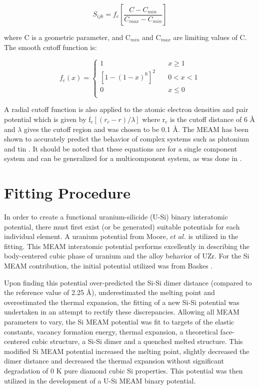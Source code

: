 \documentclass[review]{elsarticle}
\begin{document}
\begin{equation}
\label{eq:eqn15}
S_{ijk}= f_{c}\left[\frac{C-C_{min}}{C_{max}-C_{min}}\right]
\end{equation}

where C is a geometric parameter, and C$_{min}$ and C$_{max}$ are limiting values of C.  The smooth cutoff function is:

\begin{equation}
\label{eq:eqn16}
f_{c}(x) = \begin{cases}
    1       & \quad x \geq 1 \\
    [1-(1-x)^{6}]^{2}  & \quad 0 < x < 1\\
    0       & \quad x \leq 0\\
  \end{cases} 
\end{equation}

A radial cutoff function is also applied to the atomic electron densities and pair potential which is given by f$_{c}[(r_{c}-r)/\lambda]$ where r$_{c}$ is the cutoff distance of 6 {\AA } and $\lambda$ gives the cutoff region and was chosen to be 0.1 {\AA}.  The MEAM has been shown to accurately predict the behavior of complex systems such as plutonium \cite{baskes2000} and tin \cite{baskes1997}.  It should be noted that these equations are for a single component system and can be generalized for a multicomponent system, as was done in \cite{baskes2014}.  

\section{Fitting Procedure}
In order to create a functional uranium-silicide (U-Si) binary interatomic potential, there must first exist (or be generated) suitable potentials for each individual element.  A uranium potential from Moore, $\textit{et al.}$ \cite{moore2015} is utilized in the fitting.  This MEAM interatomic potential performs excellently in describing the body-centered cubic phase of uranium and the alloy behavior of UZr.  For the Si MEAM contribution, the initial potential utilized was from Baskes \cite{baskes1992}.  

Upon finding this potential over-predicted the Si-Si dimer distance (compared to the reference value of 2.25 \AA \cite{huber1979}), underestimated the melting point and overestimated the thermal expansion, the fitting of a new Si-Si potential was undertaken in an attempt to rectify these discrepancies.  Allowing all MEAM parameters to vary, the Si MEAM potential was fit to targets of the elastic constants, vacancy formation energy, thermal expansion, a theoretical face-centered cubic structure, a Si-Si dimer and a quenched melted structure.  This modified Si MEAM potential increased the melting point, slightly decreased the dimer distance and decreased the thermal expansion without significant degradation of 0 K pure diamond cubic Si properties.  This potential was then utilized in the development of a U-Si MEAM binary potential.  
\end{document}
